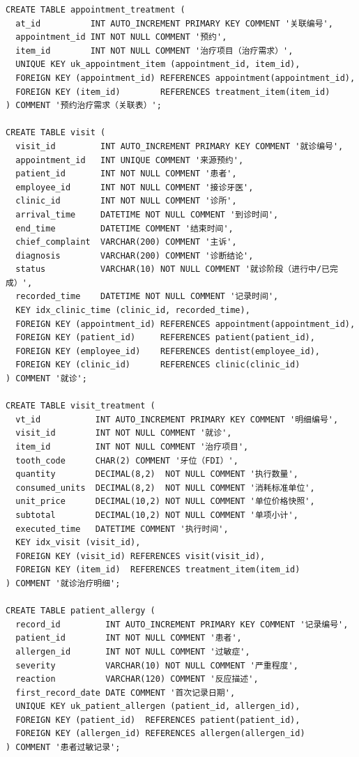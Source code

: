 \documentclass[11pt,a4paper]{ctexart}
\begin{document}
\begin{lstlisting}[style=sql]
CREATE TABLE appointment_treatment (
  at_id          INT AUTO_INCREMENT PRIMARY KEY COMMENT '关联编号',
  appointment_id INT NOT NULL COMMENT '预约',
  item_id        INT NOT NULL COMMENT '治疗项目（治疗需求）',
  UNIQUE KEY uk_appointment_item (appointment_id, item_id),
  FOREIGN KEY (appointment_id) REFERENCES appointment(appointment_id),
  FOREIGN KEY (item_id)        REFERENCES treatment_item(item_id)
) COMMENT '预约治疗需求（关联表）';

CREATE TABLE visit (
  visit_id         INT AUTO_INCREMENT PRIMARY KEY COMMENT '就诊编号',
  appointment_id   INT UNIQUE COMMENT '来源预约',
  patient_id       INT NOT NULL COMMENT '患者',
  employee_id      INT NOT NULL COMMENT '接诊牙医',
  clinic_id        INT NOT NULL COMMENT '诊所',
  arrival_time     DATETIME NOT NULL COMMENT '到诊时间',
  end_time         DATETIME COMMENT '结束时间',
  chief_complaint  VARCHAR(200) COMMENT '主诉',
  diagnosis        VARCHAR(200) COMMENT '诊断结论',
  status           VARCHAR(10) NOT NULL COMMENT '就诊阶段（进行中/已完成）',
  recorded_time    DATETIME NOT NULL COMMENT '记录时间',
  KEY idx_clinic_time (clinic_id, recorded_time),
  FOREIGN KEY (appointment_id) REFERENCES appointment(appointment_id),
  FOREIGN KEY (patient_id)     REFERENCES patient(patient_id),
  FOREIGN KEY (employee_id)    REFERENCES dentist(employee_id),
  FOREIGN KEY (clinic_id)      REFERENCES clinic(clinic_id)
) COMMENT '就诊';

CREATE TABLE visit_treatment (
  vt_id           INT AUTO_INCREMENT PRIMARY KEY COMMENT '明细编号',
  visit_id        INT NOT NULL COMMENT '就诊',
  item_id         INT NOT NULL COMMENT '治疗项目',
  tooth_code      CHAR(2) COMMENT '牙位（FDI）',
  quantity        DECIMAL(8,2)  NOT NULL COMMENT '执行数量',
  consumed_units  DECIMAL(8,2)  NOT NULL COMMENT '消耗标准单位',
  unit_price      DECIMAL(10,2) NOT NULL COMMENT '单位价格快照',
  subtotal        DECIMAL(10,2) NOT NULL COMMENT '单项小计',
  executed_time   DATETIME COMMENT '执行时间',
  KEY idx_visit (visit_id),
  FOREIGN KEY (visit_id) REFERENCES visit(visit_id),
  FOREIGN KEY (item_id)  REFERENCES treatment_item(item_id)
) COMMENT '就诊治疗明细';

CREATE TABLE patient_allergy (
  record_id         INT AUTO_INCREMENT PRIMARY KEY COMMENT '记录编号',
  patient_id        INT NOT NULL COMMENT '患者',
  allergen_id       INT NOT NULL COMMENT '过敏症',
  severity          VARCHAR(10) NOT NULL COMMENT '严重程度',
  reaction          VARCHAR(120) COMMENT '反应描述',
  first_record_date DATE COMMENT '首次记录日期',
  UNIQUE KEY uk_patient_allergen (patient_id, allergen_id),
  FOREIGN KEY (patient_id)  REFERENCES patient(patient_id),
  FOREIGN KEY (allergen_id) REFERENCES allergen(allergen_id)
) COMMENT '患者过敏记录';


\end{lstlisting}
\end{document}
